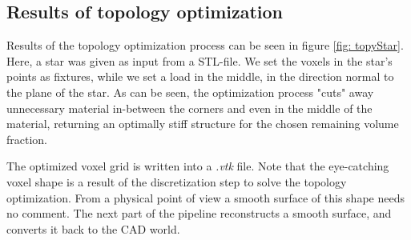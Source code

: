 \subsection{Results of topology optimization}
Results of the topology optimization process can be seen in figure \ref{fig: topyStar}. Here, a star was given as input from a STL-file. We set the voxels in the star's points as fixtures, while we set a load in the middle, in the direction normal to the plane of the star. As can be seen, the optimization process "cuts" away unnecessary material in-between the corners and even in the middle of the material, returning an optimally stiff structure for the chosen remaining volume fraction. 

The optimized voxel grid is written into a {\it.vtk} file. Note that the eye-catching voxel shape is a result of the discretization step to solve the topology optimization. From a physical point of view a smooth surface of this shape needs no comment. The next part of the pipeline reconstructs a smooth surface, and converts it back to the CAD world. 
